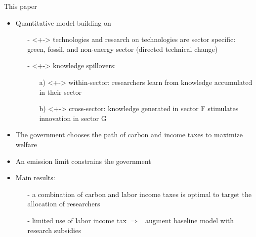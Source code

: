 \documentclass[11pt,aspectratio=169]{beamer}
\newcommand{\ar}{$\Rightarrow$ \ }
\begin{document}
\begin{frame}{This paper}
	\vspace{-2mm}
	\begin{itemize}
		\item<+-> Quantitative model building on \cite{Fried2018ClimateAnalysis} 
		\vspace{2mm}
		\begin{itemize}
			\item[-]<+-> \alert{technologies and research on technologies are sector specific}: green, fossil, and non-energy sector \footnotesize{(directed technical change) }
			\vspace{1mm}
			\item[-]<+-> \alert{knowledge spillovers}: 
			\begin{enumerate}
				\item[a)]<+-> \alert{within-sector}: researchers learn from knowledge accumulated in their sector
				\item[b)]<+-> \alert{cross-sector}: knowledge generated in sector F stimulates innovation in sector G
			\end{enumerate}%
		\end{itemize}
		\vspace{2mm}
		\item<+->   The government   chooses the \alert{path of carbon and income taxes} to maximize welfare\vspace{2mm}
		\item<+-> An \alert{emission limit} constrains the government		\vspace{2mm}
		\item<+-> \alert{Main results:} 
		\begin{itemize}
			\item[-] a combination of carbon and labor income taxes is optimal to target the allocation of researchers 	\vspace{1mm} \item[-] limited use of labor income tax \ar augment baseline model with research subsidies
		\end{itemize}
	\end{itemize}


\end{frame}
\end{document}
